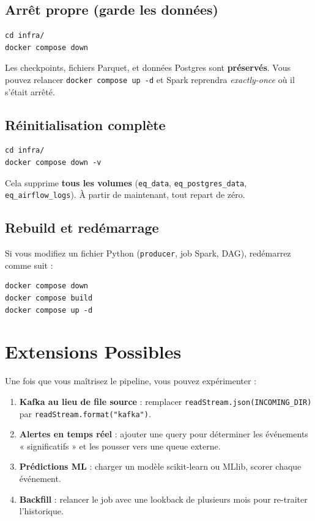 \documentclass[12pt, a4paper]{article}
\begin{document}
\subsection{Arrêt propre (garde les données)}

\begin{lstlisting}
cd infra/
docker compose down
\end{lstlisting}

Les checkpoints, fichiers Parquet, et données Postgres sont \textbf{préservés}. Vous pouvez relancer \texttt{docker compose up -d} et Spark reprendra \emph{exactly-once} où il s'était arrêté.

\subsection{Réinitialisation complète}

\begin{lstlisting}
cd infra/
docker compose down -v
\end{lstlisting}

Cela supprime \textbf{tous les volumes} (\texttt{eq\_data}, \texttt{eq\_postgres\_data}, \texttt{eq\_airflow\_logs}). À partir de maintenant, tout repart de zéro.

\subsection{Rebuild et redémarrage}

Si vous modifiez un fichier Python (\texttt{producer}, job Spark, DAG), redémarrez comme suit :

\begin{lstlisting}
docker compose down
docker compose build
docker compose up -d
\end{lstlisting}

\section{Extensions Possibles}

Une fois que vous maîtrisez le pipeline, vous pouvez expérimenter :

\begin{enumerate}
  \item \textbf{Kafka au lieu de file source} : remplacer \texttt{readStream.json(INCOMING\_DIR)} par \texttt{readStream.format("kafka")}.
  \item \textbf{Alertes en temps réel} : ajouter une query pour déterminer les événements « significatifs » et les pousser vers une queue externe.
  \item \textbf{Prédictions ML} : charger un modèle scikit-learn ou MLlib, scorer chaque événement.
  \item \textbf{Backfill} : relancer le job avec une lookback de plusieurs mois pour re-traiter l'historique.
\end{enumerate}
\end{document}
